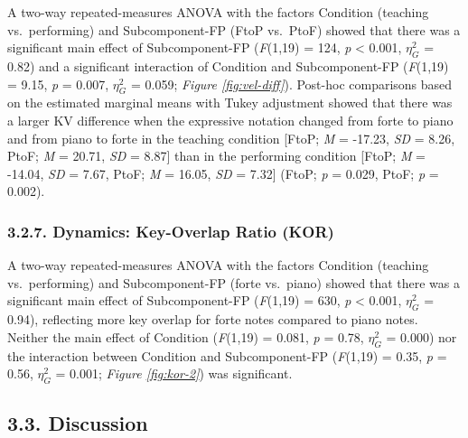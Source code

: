 \documentclass[
  english,
  man,floatsintext]{apa6}
\begin{document}
A two-way repeated-measures ANOVA with the factors Condition (teaching vs.~performing) and Subcomponent-FP (FtoP vs.~PtoF) showed that there was a significant main effect of Subcomponent-FP (\emph{F}(1,19) = 124, \emph{p} \textless{} 0.001, \(\eta_G^2\) = 0.82) and a significant interaction of Condition and Subcomponent-FP (\emph{F}(1,19) = 9.15, \emph{p} = 0.007, \(\eta_G^2\) = 0.059; \emph{Figure \ref{fig:vel-diff}}). Post-hoc comparisons based on the estimated marginal means with Tukey adjustment showed that there was a larger KV difference when the expressive notation changed from forte to piano and from piano to forte in the teaching condition {[}FtoP; \emph{M} = -17.23, \emph{SD} = 8.26, PtoF; \emph{M} = 20.71, \emph{SD} = 8.87{]} than in the performing condition {[}FtoP; \emph{M} = -14.04, \emph{SD} = 7.67, PtoF; \emph{M} = 16.05, \emph{SD} = 7.32{]} (FtoP; \emph{p} = 0.029, PtoF; \emph{p} = 0.002).

\hypertarget{dynamics-key-overlap-ratio-kor}{%
\subsubsection{3.2.7. Dynamics: Key-Overlap Ratio (KOR)}\label{dynamics-key-overlap-ratio-kor}}

A two-way repeated-measures ANOVA with the factors Condition (teaching vs.~performing) and Subcomponent-FP (forte vs.~piano) showed that there was a significant main effect of Subcomponent-FP (\emph{F}(1,19) = 630, \emph{p} \textless{} 0.001, \(\eta_G^2\) = 0.94), reflecting more key overlap for forte notes compared to piano notes. Neither the main effect of Condition (\emph{F}(1,19) = 0.081, \emph{p} = 0.78, \(\eta_G^2\) = 0.000) nor the interaction between Condition and Subcomponent-FP (\emph{F}(1,19) = 0.35, \emph{p} = 0.56, \(\eta_G^2\) = 0.001; \emph{Figure \ref{fig:kor-2}}) was significant.

\hypertarget{discussion-1}{%
\subsection{3.3. Discussion}\label{discussion-1}}
\end{document}
